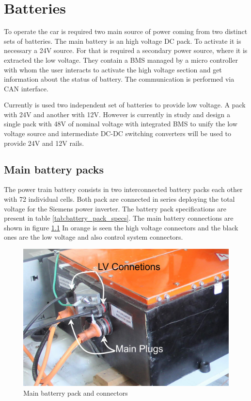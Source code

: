 \chapter{Batteries}
To operate the car is required two main source of power coming from two distinct sets of batteries. The main battery is an high voltage \gls{DC} pack. To activate it is necessary a 24V source. For that is required a secondary power source, where it is extracted the low voltage.
They contain a \gls{BMS} managed by a micro controller with whom the user interacts to activate the high voltage section and get information about the status of battery. The communication is performed via CAN interface.

Currently is used two independent set of batteries to provide low voltage. A pack with 24V and another with 12V. However is currently in study and design a single pack with 48V  of nominal voltage with integrated \gls{BMS} to unify the low voltage source and intermediate \gls{DC}-\gls{DC} switching converters will be used to provide 24V and 12V rails.

\section{Main battery packs}
The power train battery consists in two interconnected battery packs each other with 72 individual cells. Both pack are connected in series deploying the total voltage for the Siemens power inverter. The battery pack specifications are present in table \ref{tab:battery_pack_specs}. The main battery connections are shown in figure \ref{fig:battery_connections} In orange is seen the high voltage connectors and the black ones are the low voltage and also control system connectors. 

\begin{figure}[!h]
	\centering
	\includegraphics[width=0.7\linewidth]{figures/main_battery_connections}
	\caption{Main batterry pack and connectors}
	\label{fig:battery_connections}
\end{figure}

